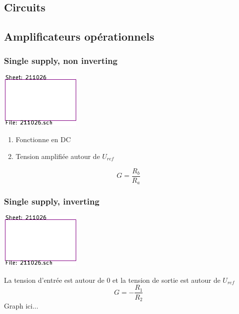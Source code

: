 \documentclass[]{article}
\begin{document}
\begin{multicols}{3}
\section{Circuits}
\subsection{Amplificateurs opérationnels}
\subsubsection{Single supply, non inverting}
\begin{center}
\includegraphics[width=0.7\columnwidth,page=3]{../KiCad/resume-crop.pdf}
\end{center}
\begin{enumerate}
\item Fonctionne en DC
\item Tension amplifiée autour de $U_{ref}$
\end{enumerate}
$$G=\frac{R_b}{R_a}$$
\subsubsection{Single supply, inverting}
\begin{center}
\includegraphics[width=0.7\columnwidth,page=4]{../KiCad/resume-crop.pdf}
\end{center}
La tension d'entrée est autour de 0 et la tension de sortie est autour de $U_{ref}$
$$G=-\frac{R_1}{R_2}$$
Graph ici...

\end{multicols}
\end{document}

